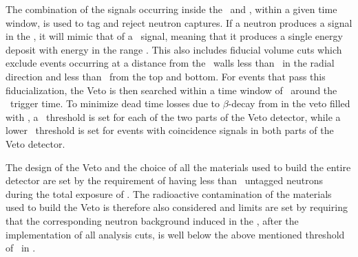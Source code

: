 The combination of the signals occurring inside the \IAB\ and \OAB, within a given time window, is used to tag and reject neutron captures.  If a neutron produces a signal in the \TPC, it will mimic that of a \WIMP\ signal, meaning that it produces a single energy deposit with energy in the range \DSkROIEnergyRange.  This also includes fiducial volume cuts which exclude events occurring at a distance from the \TPC\ walls less than \DSkVetoFVTPCcut\ in the radial direction and less than \DSkVetoFVTPCcutz\ from the top and bottom.  For events that pass this fiducialization, the Veto is then searched within a time window of  \DSkVetoTimeCut\ around the \TPC\ trigger time. To minimize dead time losses due to $\beta$-decay from  in the veto filled with \AAr,  a \ABSingleThreshold\ threshold is set for each of the two parts of the Veto detector, while a lower \ABCoincidenceThreshold\ threshold is set for events with coincidence signals in both parts of the Veto detector.

The design of the Veto and the choice of all the materials used to build the entire detector are set by the requirement of having less than \BackgroundFreeRequirement\ untagged neutrons during the total exposure of \DSkExtendedExposure.  The radioactive contamination of the materials used to build the Veto is therefore also considered and limits are set by requiring that the corresponding neutron background induced in the \TPC, after the implementation of all analysis cuts, is well below the above mentioned threshold of \BackgroundFreeRequirement\ in \DSkExtendedExposure.

